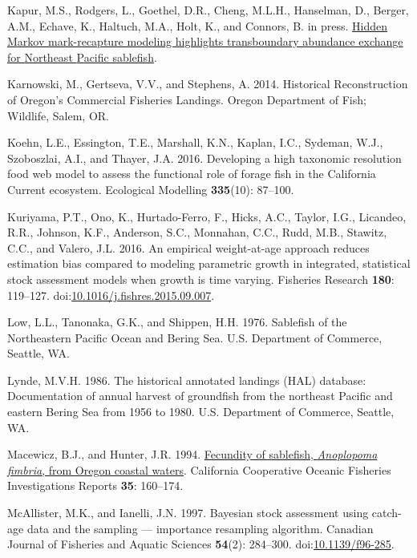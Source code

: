 \documentclass[
  english,
]{article}
\newlength{\cslhangindent}
\newenvironment{CSLReferences}[2] %
 {\begin{list}{}{%
  \setlength{\itemindent}{0pt}
  \setlength{\leftmargin}{0pt}
  \setlength{\parsep}{0pt}
  \ifodd #1
   \setlength{\leftmargin}{\cslhangindent}
   \setlength{\itemindent}{-1\cslhangindent}
  \fi
  \setlength{\itemsep}{#2\baselineskip}}}
 {\end{list}}
\begin{document}
\begin{CSLReferences}{1}{0}
Kapur, M.S., Rodgers, L., Goethel, D.R., Cheng, M.L.H., Hanselman, D.,
Berger, A.M., Echave, K., Haltuch, M.A., Holt, K., and Connors, B. in
press. \href{}{Hidden {M}arkov mark-recapture modeling highlights
transboundary abundance exchange for {N}ortheast {P}acific sablefish}.

Karnowski, M., Gertseva, V.V., and Stephens, A. 2014. Historical
{Reconstruction} of {Oregon}'s {Commercial} {Fisheries} {Landings}.
Oregon Department of Fish; Wildlife, Salem, OR.

Koehn, L.E., Essington, T.E., Marshall, K.N., Kaplan, I.C., Sydeman,
W.J., Szoboszlai, A.I., and Thayer, J.A. 2016. Developing a high
taxonomic resolution food web model to assess the functional role of
forage fish in the {C}alifornia {C}urrent ecosystem. Ecological
Modelling \textbf{335}(10): 87--100.

Kuriyama, P.T., Ono, K., Hurtado-Ferro, F., Hicks, A.C., Taylor, I.G.,
Licandeo, R.R., Johnson, K.F., Anderson, S.C., Monnahan, C.C., Rudd,
M.B., Stawitz, C.C., and Valero, J.L. 2016. An empirical weight-at-age
approach reduces estimation bias compared to modeling parametric growth
in integrated, statistical stock assessment models when growth is time
varying. Fisheries Research \textbf{180}: 119--127.
doi:\href{https://doi.org/10.1016/j.fishres.2015.09.007}{10.1016/j.fishres.2015.09.007}.

Low, L.L., Tanonaka, G.K., and Shippen, H.H. 1976. Sablefish of the
{N}ortheastern {P}acific {O}cean and {B}ering {S}ea. {U}.{S}. Department
of Commerce, Seattle, WA.

Lynde, M.V.H. 1986. The historical annotated landings ({HAL}) database:
Documentation of annual harvest of groundfish from the northeast
{P}acific and eastern {B}ering {S}ea from 1956 to 1980. {U}.{S}.
Department of Commerce, Seattle, WA.

Macewicz, B.J., and Hunter, J.R. 1994. \href{}{Fecundity of sablefish,
\emph{{A}noplopoma fimbria}, from {O}regon coastal waters}. California
Cooperative Oceanic Fisheries Investigations Reports \textbf{35}:
160--174.

McAllister, M.K., and Ianelli, J.N. 1997. Bayesian stock assessment
using catch-age data and the sampling --- importance resampling
algorithm. Canadian Journal of Fisheries and Aquatic Sciences
\textbf{54}(2): 284--300.
doi:\href{https://doi.org/10.1139/f96-285}{10.1139/f96-285}.


\end{CSLReferences}
\end{document}
